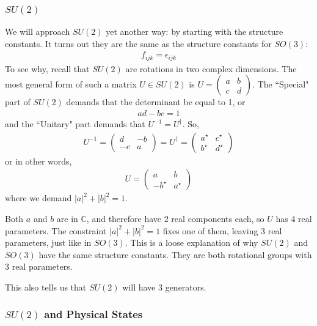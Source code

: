 \documentclass[12pt,epsf]{article}
\def\nolabel{\nonumber }
\def\nolabel{\nonumber }
\begin{document}
\subsubsection{$SU(2)$}

We will approach $SU(2)$ yet another way: by starting with the
structure constants.  It turns out they are the same as the structure
constants for $SO(3)$:
\begin{eqnarray}
f_{ijk} = \epsilon_{ijk} \label{eq:su2structurecon}
\end{eqnarray}
To see why, recall that $SU(2)$ are rotations in two complex
dimensions.  The most general form of such a matrix $U \in SU(2)$ is $U
= 
\begin{pmatrix}
a & b \\ c & d
\end{pmatrix}$.  The ``Special" part of $SU(2)$ demands that the
determinant be equal to 1, or 
\begin{eqnarray}
ad - bc = 1 \nolabel 
\end{eqnarray}
and the ``Unitary" part demands that $U^{-1} = U^{\dagger}$.  So, 
\begin{eqnarray}
U^{-1} = 
\begin{pmatrix}
d & -b \\ -c & a
\end{pmatrix} = U^{\dagger} = 
\begin{pmatrix}
a^{\star} & c^{\star} \\ b^{\star} & d^{\star}
\end{pmatrix}\nolabel 
\end{eqnarray}
or in other words, 
\begin{eqnarray}
U = 
\begin{pmatrix}
a & b \\ -b^{\star} & a^{\star}
\end{pmatrix}\nolabel 
\end{eqnarray}
where we demand $|a|^2+|b|^2 = 1$.  

Both $a$ and $b$ are in $\mathbb{C}$, and therefore have 2 real
components each, so $U$ has 4 real parameters.  The constraint
$|a|^2+|b|^2 = 1$ fixes one of them, leaving 3 real parameters, just
like in $SO(3)$.  This is a loose explanation of why $SU(2)$ and
$SO(3)$ have the same structure constants.  They are both rotational
groups with 3 real parameters.  

This also tells us that $SU(2)$ will have 3 generators.  

\subsubsection{$SU(2)$ and Physical States}
\end{document}
